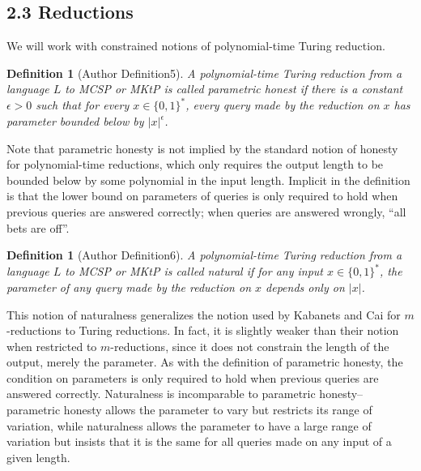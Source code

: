 \documentclass[10pt,a4paper]{article}
\newtheorem{ntdefinition}[nttheorem]{Definition}
\begin{document}
\subsection*{2.3 Reductions}
We will work with constrained notions of polynomial-time Turing reduction.
\begin{ntdefinition}[Author Definition5]
A polynomial-time Turing reduction from a language $L$ to MCSP or MKtP is called parametric honest if there is a constant $\epsilon>0$ such that for every $x\in\{0,1\}^*$, every query made by the reduction on $x$ has parameter bounded below by $|x|^\epsilon$.
\end{ntdefinition}
Note that parametric honesty is not implied by the standard notion of honesty for polynomial-time reductions, which only requires the output length to be bounded below by some polynomial in the input length. Implicit in the definition is that the lower bound on parameters of queries is only required to hold when previous queries are answered correctly; when queries are answered wrongly, ``all bets are off''.
\begin{ntdefinition}[Author Definition6]
A polynomial-time Turing reduction from a language $L$ to MCSP or MKtP is called natural if for any input $x\in\{0,1\}^*$, the parameter of any query made by the reduction on $x$ depends only on $|x|$.
\end{ntdefinition}
This notion of naturalness generalizes the notion used by Kabanets and Cai for $m$-reductions to Turing reductions. In fact, it is slightly weaker than their notion when restricted to $m$-reductions, since it does not constrain the length of the output, merely the parameter. As with the definition of parametric honesty, the condition on parameters is only required to hold when previous queries are answered correctly.
Naturalness is incomparable to parametric honesty--parametric honesty allows the parameter to vary but restricts its range of variation, while naturalness allows the parameter to have a large range of variation but insists that it is the same for all queries made on any input of a given length.
\end{document}
